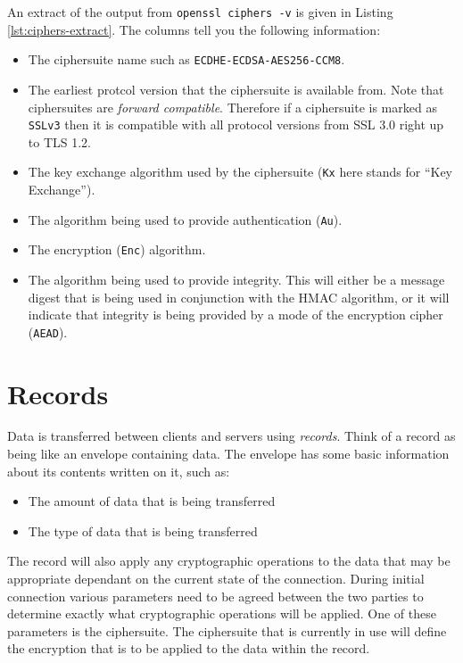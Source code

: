 An extract of the output from \lstinline!openssl ciphers -v! is given in 
Listing \ref{lst:ciphers-extract}. The columns tell you the following
information:
\begin{itemize}
\item The ciphersuite name such as \lstinline!ECDHE-ECDSA-AES256-CCM8!.
\item The earliest protcol version that the ciphersuite is available from. Note 
that ciphersuites are \emph{forward compatible}. Therefore if a ciphersuite is
marked as \lstinline!SSLv3! then it is compatible with all protocol versions 
from SSL 3.0 right up to TLS 1.2.
\item The key exchange algorithm used by the ciphersuite (\lstinline!Kx! here 
stands for ``Key Exchange'').
\item The algorithm being used to provide authentication (\lstinline!Au!).
\item The encryption (\lstinline!Enc!) algorithm.
\item The algorithm being used to provide integrity. This will either be a 
message digest that is being used in conjunction with the HMAC algorithm, or it
will indicate that integrity is being provided by a mode of the encryption 
cipher (\lstinline!AEAD!).
\end{itemize}

\section{Records}

Data is transferred between clients and servers using \emph{records}. Think of 
a record as being like an envelope containing data. The envelope has some basic 
information about its contents written on it, such as:
\begin{itemize}
\item The amount of data that is being transferred
\item The type of data that is being transferred
\end{itemize}

The record will also apply any cryptographic operations to the data that may be 
appropriate dependant on the current state of the connection. During initial 
connection various parameters need to be agreed between the two parties to 
determine exactly what cryptographic operations will be applied. One of these 
parameters is the ciphersuite. The ciphersuite that is currently in use will 
define the encryption that is to be applied to the data within the record.

